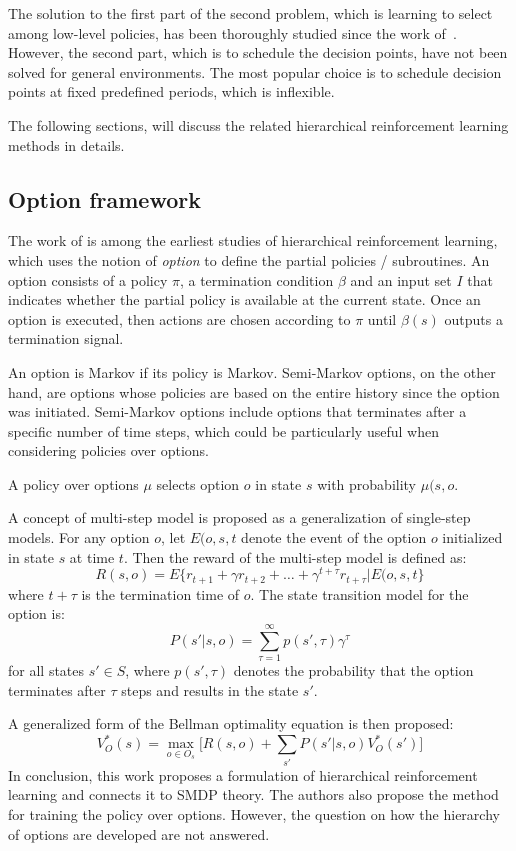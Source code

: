 The solution to the first part of the second problem, which is learning to select among low-level policies, has been thoroughly studied since the work of~\cite{sutton1999between}. However, the second part, which is to schedule the decision points, have not been solved for general environments. The most popular choice is to schedule decision points at fixed predefined periods, which is inflexible.

The following sections, will discuss the related hierarchical reinforcement learning methods in details.

\subsection{Option framework}
The work of \cite{sutton1999between} is among the earliest studies of hierarchical reinforcement learning, which uses the notion of \textit{option} to define the partial policies / subroutines. An option consists of a policy $\pi$, a termination condition $\beta$ and an input set $I$ that indicates whether the partial policy is available at the current state. Once an option is executed, then actions are chosen according to \(\pi\) until \(\beta(s)\) outputs a termination signal. 

An option is Markov if its policy is Markov. Semi-Markov options, on the other hand, are options whose policies are based on the entire history since the option was initiated. Semi-Markov options include options that terminates after a specific number of time steps, which could be particularly useful when considering policies over options.

A policy over options \(\mu \) selects option \(o\) in state \(s\) with probability \(\mu(s,o\).

A concept of multi-step model is proposed as a generalization of single-step models. For any option \(o\), let \(E(o,s,t\) denote the event of the option $o$ initialized in state $s$ at time $t$. Then the reward of the multi-step model is defined as:
\[ R(s,o)=E\{r_{t+1}+\gamma r_{t+2}+\ldots+\gamma^{t+\tau} r_{t+\tau} \lvert E(o,s,t\} \]
where $t+\tau$ is the termination time of $o$. The state transition model for the option is:
\[P(s' \lvert s,o)=\sum_{\tau=1}^{\infty} p(s',\tau) \gamma^\tau \]
for all states \(s' \in S \), where \( p(s',\tau) \) denotes the probability that the option terminates after \(\tau\) steps and results in the state \(s'\).

A generalized form of the Bellman optimality equation is then proposed:
\begin{equation}
    V_O^*(s) = \max_{o \in O_s} \big[ R(s,o)+\sum_{s'}P(s' \lvert s,o) V_O^*(s') \big]
\end{equation}
In conclusion, this work proposes a formulation of hierarchical reinforcement learning and connects it to SMDP theory. The authors also propose the method for training the policy over options. However, the question on how the hierarchy of options are developed are not answered.
